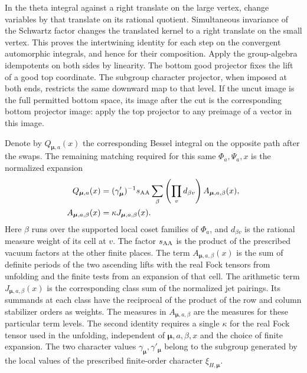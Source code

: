 In the theta integral against a right translate on the large
vertex, change variables by that translate on its rational
quotient. Simultaneous invariance of the Schwartz factor changes
the translated kernel to a right translate on the small vertex.
This proves the intertwining identity for each step on the
convergent automorphic integrals, and hence for their composition.
Apply the group-algebra idempotents on both sides by linearity.
The bottom good projector fixes the lift of a good top
coordinate. The subgroup character projector, when imposed at
both ends, restricts the same downward map to that level.
If the uncut image is the full permitted bottom space, its image
after the cut is the corresponding bottom projector image: apply
the top projector to any preimage of a vector in this image.

Denote by \(Q_{\boldsymbol\mu,a}(x)\) the corresponding Bessel
integral on the opposite path after the swaps. The remaining
matching required for this same \(\Phi_a,\Psi_a,x\) is the normalized
expansion
\begin{equation}
\label{eq:period-principal-unfolding}
\begin{aligned}
 Q_{\boldsymbol\mu,a}(x)
   &= (\gamma'_{\boldsymbol\mu})^{-1}
      s_{\rm AA}\sum_{\beta}
      \left(\prod_v d_{\beta v}\right)A_{\boldsymbol\mu,a,\beta}(x),\\
 A_{\boldsymbol\mu,a,\beta}(x)
   &=\kappa J_{\boldsymbol\mu,a,\beta}(x).
\end{aligned}
\end{equation}
Here \(\beta\) runs over the supported local coset families of
\(\Phi_a\), and \(d_{\beta v}\) is the rational measure weight of its
cell at \(v\). The factor \(s_{\rm AA}\) is the product of the
prescribed vacuum factors at the other finite places. The term
\(A_{\boldsymbol\mu,a,\beta}(x)\) is the sum of definite periods of
the two ascending lifts with the real Fock tensors from unfolding
and the finite tests from an expansion of that cell.
The arithmetic term \(J_{\boldsymbol\mu,a,\beta}(x)\) is the
corresponding class sum of the normalized jet pairings. Its
summands at each class have the reciprocal of the product of the
row and column stabilizer orders as weights. The measures in
\(A_{\boldsymbol\mu,a,\beta}\) are the measures for these particular
term levels. The second identity requires a single \(\kappa\) for
the real Fock tensor used in the unfolding, independent of
\(\boldsymbol\mu,a,\beta,x\) and the choice of finite expansion.
The two character values \(\gamma_{\boldsymbol\mu},
\gamma'_{\boldsymbol\mu}\) belong to the subgroup generated by the
local values of the prescribed finite-order character
\(\xi_{H,\boldsymbol\mu}\).

